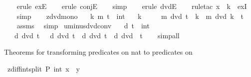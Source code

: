 \begin{isabellebody}
\ \ \isamarkupfalse%
\ {\isacharparenleft}{\kern0pt}erule\ exE{\isacharparenright}{\kern0pt}\isanewline
\ \ \isamarkupfalse%
\ {\isacharparenleft}{\kern0pt}erule\ conjE{\isacharparenright}{\kern0pt}\isanewline
\ \ \isamarkupfalse%
\ simp\isanewline
\ \ \isamarkupfalse%
\ {\isacharparenleft}{\kern0pt}erule\ dvdE{\isacharparenright}{\kern0pt}\isanewline
\ \ \isamarkupfalse%
\ {\isacharparenleft}{\kern0pt}rule{\isacharunderscore}{\kern0pt}tac\ x\ {\isacharequal}{\kern0pt}\ k\ \ exI{\isacharparenright}{\kern0pt}\isanewline
\ \ \isamarkupfalse%
\ simp\isanewline
\ \ \isamarkupfalse%
%
\endisatagproof
{\isafoldproof}%
%
\isadelimproof
\isanewline
%
\endisadelimproof
\isanewline
{}\isamarkupfalse%
\ zdvd{\isacharunderscore}{\kern0pt}mono{\isacharcolon}{\kern0pt}\isanewline
\ \ \ k\ m\ t\ {\isacharcolon}{\kern0pt}{\isacharcolon}{\kern0pt}\ int\isanewline
\ \ \ {\isachardoublequoteopen}k\ {\isasymnoteq}\ {}{\isachardoublequoteclose}\isanewline
\ \ \ {\isachardoublequoteopen}m\ dvd\ t\ {\isasymequiv}\ k\ {\isacharasterisk}{\kern0pt}\ m\ dvd\ k\ {\isacharasterisk}{\kern0pt}\ t{\isachardoublequoteclose}\ \isanewline
%
\isadelimproof
\ \ %
\endisadelimproof
%
\isatagproof
{}\isamarkupfalse%
\ assms\ \isamarkupfalse%
\ simp%
\endisatagproof
{\isafoldproof}%
%
\isadelimproof
\isanewline
%
\endisadelimproof
\isanewline
{}\isamarkupfalse%
\ uminus{\isacharunderscore}{\kern0pt}dvd{\isacharunderscore}{\kern0pt}conv{\isacharcolon}{\kern0pt}\isanewline
\ \ \ d\ t\ {\isacharcolon}{\kern0pt}{\isacharcolon}{\kern0pt}\ int\isanewline
\ \ \ {\isachardoublequoteopen}d\ dvd\ t\ {\isasymequiv}\ {\isacharminus}{\kern0pt}\ d\ dvd\ t{\isachardoublequoteclose}\ \ {\isachardoublequoteopen}d\ dvd\ t\ {\isasymequiv}\ d\ dvd\ {\isacharminus}{\kern0pt}\ t{\isachardoublequoteclose}\isanewline
%
\isadelimproof
\ \ %
\endisadelimproof
%
\isatagproof
{}\isamarkupfalse%
\ simp{\isacharunderscore}{\kern0pt}all%
\endisatagproof
{\isafoldproof}%
%
\isadelimproof
%
\endisadelimproof
%
\begin{isamarkuptext}%
\bigskip Theorems for transforming predicates on nat to predicates on %
\end{isamarkuptext}\isamarkuptrue%
\isamarkupfalse%
\ zdiff{\isacharunderscore}{\kern0pt}int{\isacharunderscore}{\kern0pt}split{\isacharcolon}{\kern0pt}\ {\isachardoublequoteopen}P\ {\isacharparenleft}{\kern0pt}int\ {\isacharparenleft}{\kern0pt}x\ {\isacharminus}{\kern0pt}\ y{\isacharparenright}{\kern0pt}{\isacharparenright}{\kern0pt}\ {\isacharequal}{\kern0pt}\isanewline

\end{isabellebody}
